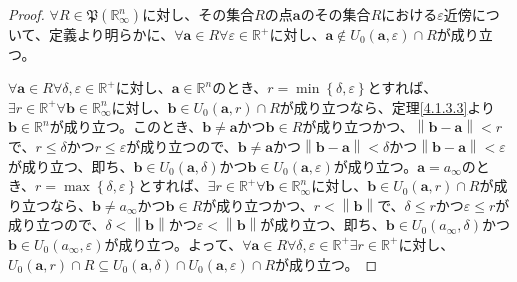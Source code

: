 \documentclass[dvipdfmx]{jsarticle}
\begin{document}
\begin{proof}
$\forall R \in \mathfrak{P}\left( \mathbb{R}_{\infty}^{n} \right)$に対し、その集合$R$の点$\mathbf{a}$のその集合$R$における$\varepsilon$近傍について、定義より明らかに、$\forall\mathbf{a} \in R\forall\varepsilon \in \mathbb{R}^{+}$に対し、$\mathbf{a} \notin U_{0}\left( \mathbf{a},\varepsilon \right) \cap R$が成り立つ。\par
$\forall\mathbf{a} \in R\forall\delta,\varepsilon \in \mathbb{R}^{+}$に対し、$\mathbf{a} \in \mathbb{R}^{n}$のとき、$r = \min\left\{ \delta,\varepsilon \right\}$とすれば、$\exists r \in \mathbb{R}^{+}\forall\mathbf{b} \in \mathbb{R}_{\infty}^{n}$に対し、$\mathbf{b} \in U_{0}\left( \mathbf{a},r \right) \cap R$が成り立つなら、定理\ref{4.1.3.3}より$\mathbf{b} \in \mathbb{R}^{n}$が成り立つ。このとき、$\mathbf{b} \neq \mathbf{a}$かつ$\mathbf{b} \in R$が成り立つかつ、$\left\| \mathbf{b} - \mathbf{a} \right\| < r$で、$r \leq \delta$かつ$r \leq \varepsilon$が成り立つので、$\mathbf{b} \neq \mathbf{a}$かつ$\left\| \mathbf{b} - \mathbf{a} \right\| < \delta$かつ$\left\| \mathbf{b} - \mathbf{a} \right\| < \varepsilon$が成り立つ、即ち、$\mathbf{b} \in U_{0}\left( \mathbf{a},\delta \right)$かつ$\mathbf{b} \in U_{0}\left( \mathbf{a},\varepsilon \right)$が成り立つ。$\mathbf{a} = a_{\infty}$のとき、$r = \max\left\{ \delta,\varepsilon \right\}$とすれば、$\exists r \in \mathbb{R}^{+}\forall\mathbf{b} \in \mathbb{R}_{\infty}^{n}$に対し、$\mathbf{b} \in U_{0}\left( \mathbf{a},r \right) \cap R$が成り立つなら、$\mathbf{b} \neq a_{\infty}$かつ$\mathbf{b} \in R$が成り立つかつ、$r < \left\| \mathbf{b} \right\|$で、$\delta \leq r$かつ$\varepsilon \leq r$が成り立つので、$\delta < \left\| \mathbf{b} \right\|$かつ$\varepsilon < \left\| \mathbf{b} \right\|$が成り立つ、即ち、$\mathbf{b} \in U_{0}\left( a_{\infty},\delta \right)$かつ$\mathbf{b} \in U_{0}\left( a_{\infty},\varepsilon \right)$が成り立つ。よって、$\forall\mathbf{a} \in R\forall\delta,\varepsilon \in \mathbb{R}^{+}\exists r \in \mathbb{R}^{+}$に対し、$U_{0}\left( \mathbf{a},r \right) \cap R \subseteq U_{0}\left( \mathbf{a},\delta \right) \cap U_{0}\left( \mathbf{a},\varepsilon \right) \cap R$が成り立つ。
\end{proof}
\end{document}
